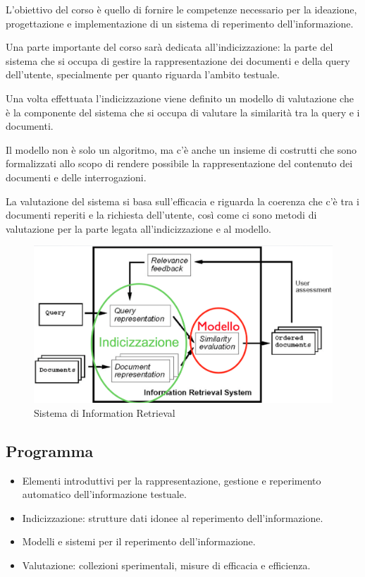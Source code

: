 L'obiettivo del corso è quello di fornire le competenze necessario per la ideazione, progettazione e implementazione di un sistema di reperimento dell'informazione.

Una parte importante del corso sarà dedicata all'indicizzazione: la parte del sistema che si occupa di gestire la rappresentazione dei documenti e della query dell'utente, specialmente per quanto riguarda l'ambito testuale.

Una volta effettuata l'indicizzazione viene definito un modello di valutazione che è la componente del sistema che si occupa di valutare la similarità tra la query e i documenti.

Il modello non è solo un algoritmo, ma c'è anche un insieme di costrutti che sono formalizzati allo scopo di rendere possibile la rappresentazione del contenuto dei documenti e delle interrogazioni. 

La valutazione del sistema si basa sull'efficacia e riguarda la coerenza che c'è tra i documenti reperiti e la richiesta dell'utente, così come ci sono metodi di valutazione per la parte legata all'indicizzazione e al modello.

\begin{figure}[htbp]
	\centering
	\includegraphics[width=.6\textwidth]{images/l1-irs.png}
	\caption{Sistema di Information Retrieval}
\end{figure}

\subsection{Programma}

\begin{itemize}
	\item Elementi introduttivi per la rappresentazione, gestione e reperimento automatico dell'informazione testuale.
	\item Indicizzazione: strutture dati idonee al reperimento dell'informazione.
	\item Modelli e sistemi per il reperimento dell'informazione.
	\item Valutazione: collezioni sperimentali, misure di efficacia e efficienza.
\end{itemize}
